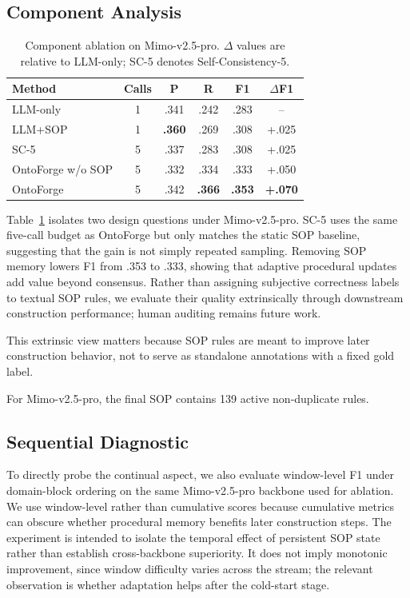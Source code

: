 \documentclass[sigconf]{acmart}
\begin{document}
\subsection{Component Analysis}

\begin{table}[t]
\centering
\small
\setlength{\tabcolsep}{2pt}
\renewcommand{\arraystretch}{1.01}
\caption{Component ablation on Mimo-v2.5-pro. $\Delta$ values are relative to LLM-only; SC-5 denotes Self-Consistency-5.}
\label{tab:ablation}
\begin{tabular*}{\columnwidth}{@{\extracolsep{\fill}}lccccc@{}}
\toprule
Method & Calls & P & R & F1 & $\Delta$F1 \\
\midrule
LLM-only & 1 & .341 & .242 & .283 & -- \\
LLM+SOP & 1 & \textbf{.360} & .269 & .308 & +.025 \\
SC-5 & 5 & .337 & .283 & .308 & +.025 \\
OntoForge w/o SOP & 5 & .332 & .334 & .333 & +.050 \\
\midrule
OntoForge & 5 & .342 & \textbf{.366} & \textbf{.353} & \textbf{+.070} \\
\bottomrule
\end{tabular*}
\renewcommand{\arraystretch}{1.0}
\end{table}

Table~\ref{tab:ablation} isolates two design questions under Mimo-v2.5-pro. SC-5 uses the same five-call budget as OntoForge but only matches the static SOP baseline, suggesting that the gain is not simply repeated sampling. Removing SOP memory lowers F1 from .353 to .333, showing that adaptive procedural updates add value beyond consensus. Rather than assigning subjective correctness labels to textual SOP rules, we evaluate their quality extrinsically through downstream construction performance; human auditing remains future work.

This extrinsic view matters because SOP rules are meant to improve later construction behavior, not to serve as standalone annotations with a fixed gold label.

For Mimo-v2.5-pro, the final SOP contains 139 active non-duplicate rules.

\subsection{Sequential Diagnostic}

To directly probe the continual aspect, we also evaluate window-level F1 under domain-block ordering on the same Mimo-v2.5-pro backbone used for ablation. We use window-level rather than cumulative scores because cumulative metrics can obscure whether procedural memory benefits later construction steps. The experiment is intended to isolate the temporal effect of persistent SOP state rather than establish cross-backbone superiority. It does not imply monotonic improvement, since window difficulty varies across the stream; the relevant observation is whether adaptation helps after the cold-start stage.
\end{document}
